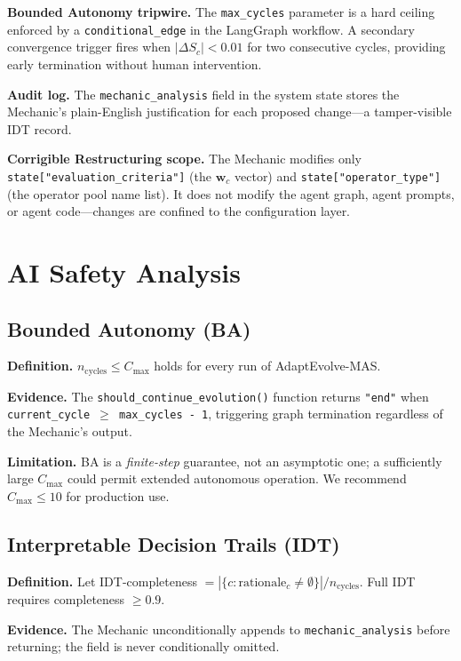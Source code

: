 \documentclass[letterpaper]{article}
\begin{document}
\textbf{Bounded Autonomy tripwire.}  The \texttt{max\_cycles} parameter
is a hard ceiling enforced by a \texttt{conditional\_edge} in the
LangGraph workflow.  A secondary convergence trigger fires when
$|\Delta S_c| < 0.01$ for two consecutive cycles, providing early
termination without human intervention.

\textbf{Audit log.}  The \texttt{mechanic\_analysis} field in the
system state stores the Mechanic's plain-English justification for each
proposed change---a tamper-visible IDT record.

\textbf{Corrigible Restructuring scope.}  The Mechanic modifies only
\texttt{state["evaluation\_criteria"]} (the $\mathbf{w}_c$ vector) and
\texttt{state["operator\_type"]} (the operator pool name list).  It
does not modify the agent graph, agent prompts, or agent code---changes
are confined to the configuration layer.

\section{AI Safety Analysis}

\subsection{Bounded Autonomy (BA)}

\textbf{Definition.} $n_{\text{cycles}} \leq C_{\max}$ holds for every
run of AdaptEvolve-MAS.

\textbf{Evidence.} The \texttt{should\_continue\_evolution()} function
returns \texttt{"end"} when \texttt{current\_cycle $\geq$ max\_cycles - 1},
triggering graph termination regardless of the Mechanic's output.

\textbf{Limitation.} BA is a \emph{finite-step} guarantee, not an
asymptotic one; a sufficiently large $C_{\max}$ could permit extended
autonomous operation.  We recommend $C_{\max} \leq 10$ for production use.

\subsection{Interpretable Decision Trails (IDT)}

\textbf{Definition.} Let IDT-completeness $=
|\{c : \text{rationale}_c \neq \emptyset\}| / n_{\text{cycles}}$.
Full IDT requires completeness $\geq 0.9$.

\textbf{Evidence.} The Mechanic unconditionally appends to
\texttt{mechanic\_analysis} before returning; the field is never
conditionally omitted.
\end{document}
